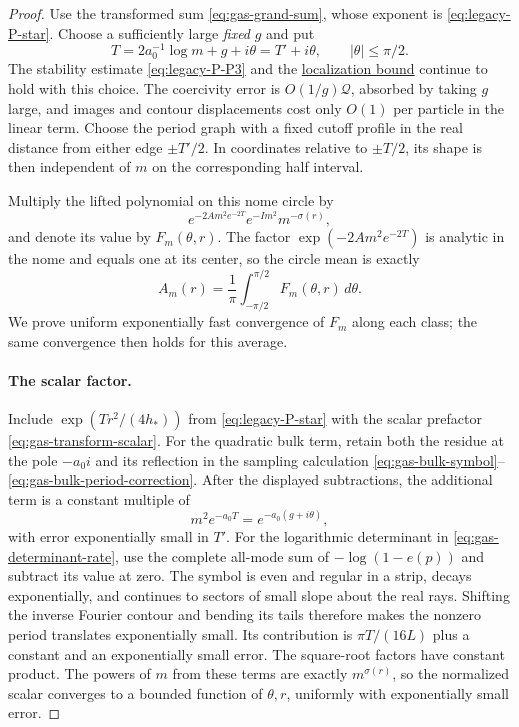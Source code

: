 \begin{proof}
Use the transformed sum \eqref{eq:gas-grand-sum}, whose exponent is \eqref{eq:legacy-P-star}. Choose a sufficiently large \emph{fixed} $g$ and put
\[
 T=2a_0^{-1}\log m+g+i\theta=T'+i\theta,
 \qquad |\theta|\le\pi/2.
\]
The stability estimate \eqref{eq:legacy-P-P3} and the \hyperref[gas:grand-localization]{localization bound} continue to hold with this choice. The coercivity error is $O(1/g)\mathcal Q$, absorbed by taking $g$ large, and images and contour displacements cost only $O(1)$ per particle in the linear term. Choose the period graph with a fixed cutoff profile in the real distance from either edge $\pm T'/2$. In coordinates relative to $\pm T/2$, its shape is then independent of $m$ on the corresponding half interval.

Multiply the lifted polynomial on this nome circle by
\[
 e^{-2Am^2e^{-2T}}e^{-Im^2}m^{-\sigma(r)},
\]
and denote its value by $F_m(\theta,r)$. The factor $\exp(-2Am^2e^{-2T})$ is analytic in the nome and equals one at its center, so the circle mean is exactly
\begin{equation}\label{eq:normalization-circle-mean}
 A_m(r)=\frac1\pi\int_{-\pi/2}^{\pi/2}F_m(\theta,r)\,d\theta.
\end{equation}
We prove uniform exponentially fast convergence of $F_m$ along each class; the same convergence then holds for this average.

\paragraph{The scalar factor.}
Include $\exp(Tr^2/(4h_*))$ from \eqref{eq:legacy-P-star} with the scalar prefactor \eqref{eq:gas-transform-scalar}. For the quadratic bulk term, retain both the residue at the pole $-a_0i$ and its reflection in the sampling calculation \eqref{eq:gas-bulk-symbol}--\eqref{eq:gas-bulk-period-correction}. After the displayed subtractions, the additional term is a constant multiple of
\[
 m^2e^{-a_0T}=e^{-a_0(g+i\theta)},
\]
with error exponentially small in $T'$. For the logarithmic determinant in \eqref{eq:gas-determinant-rate}, use the complete all-mode sum of $-\log(1-e(p))$ and subtract its value at zero. The symbol is even and regular in a strip, decays exponentially, and continues to sectors of small slope about the real rays. Shifting the inverse Fourier contour and bending its tails therefore makes the nonzero period translates exponentially small. Its contribution is $\pi T/(16L)$ plus a constant and an exponentially small error. The square-root factors have constant product. The powers of $m$ from these terms are exactly $m^{\sigma(r)}$, so the normalized scalar converges to a bounded function of $\theta,r$, uniformly with exponentially small error.


\end{proof}
